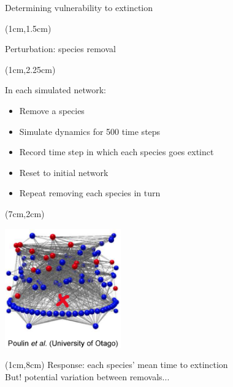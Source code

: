 \documentclass{beamer}
\begin{document}
  \begin{frame}{Determining vulnerability to extinction}

    \begin{textblock*}{7cm}(1cm,1.5cm)

      {\color{DarkBlue}Perturbation: species removal}

    \end{textblock*}

    \begin{textblock*}{5cm}(1cm,2.25cm)

      {\color{DarkBlue}In each simulated network:}

      \begin{itemize}
        \item Remove a species
        \item Simulate dynamics for 500 time steps
        \item Record time step in which each species goes extinct
        \item Reset to initial network
        \item Repeat removing each species in turn

      \end{itemize}

      \end{textblock*}

    \begin{textblock*}{5cm}(7cm,2cm)

      \includegraphics[width=5cm]{intro_figs/Otagoweb_remove2.eps}

      \end{textblock*}

    \begin{textblock*}{10cm}(1cm,8cm)
      {\color{DarkBlue} Response: each species' mean time to extinction}\\
      {\color{white}But! potential variation between removals...}
      \end{textblock*}

    \end{frame}
\end{document}
